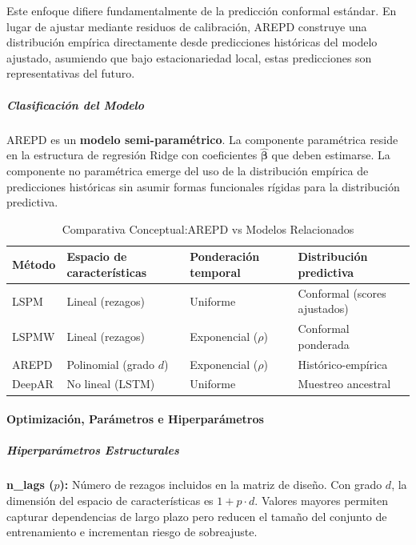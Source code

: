 Este enfoque difiere fundamentalmente de la predicción conformal estándar. En lugar de ajustar mediante residuos de calibración, AREPD construye una distribución empírica directamente desde predicciones históricas del modelo ajustado, asumiendo que bajo estacionariedad local, estas predicciones son representativas del futuro.

\subparagraph{Clasificación del Modelo}

AREPD es un \textbf{modelo semi-paramétrico}. La componente paramétrica reside en la estructura de regresión Ridge con coeficientes $\hat{\boldsymbol{\beta}}$ que deben estimarse. La componente no paramétrica emerge del uso de la distribución empírica de predicciones históricas sin asumir formas funcionales rígidas para la distribución predictiva.

\begin{table}[htbp]
\centering
\caption{Comparativa Conceptual:AREPD vs Modelos Relacionados}
\label{tab:arepd_conceptual}
\small
\begin{tabular}{>{\raggedright\arraybackslash}p{3cm}%
                >{\raggedright\arraybackslash}p{3.5cm}%
                >{\raggedright\arraybackslash}p{3cm}%
                >{\raggedright\arraybackslash}p{4cm}}
\toprule
\textbf{Método} & \textbf{Espacio de características} & \textbf{Ponderación temporal} & \textbf{Distribución predictiva} \\
\midrule
LSPM & Lineal (rezagos) & Uniforme & Conformal (scores ajustados) \\
LSPMW & Lineal (rezagos) & Exponencial ($\rho$) & Conformal ponderada \\
AREPD & Polinomial (grado $d$) & Exponencial ($\rho$) & Histórico-empírica \\
DeepAR & No lineal (LSTM) & Uniforme & Muestreo ancestral \\
\bottomrule
\end{tabular}
\end{table}


\paragraph{Optimización, Parámetros e Hiperparámetros}

\subparagraph{Hiperparámetros Estructurales}

\textbf{n\_lags ($p$):} Número de rezagos incluidos en la matriz de diseño. Con grado $d$, la dimensión del espacio de características es $1 + p \cdot d$. Valores mayores permiten capturar dependencias de largo plazo pero reducen el tamaño del conjunto de entrenamiento e incrementan riesgo de sobreajuste.

